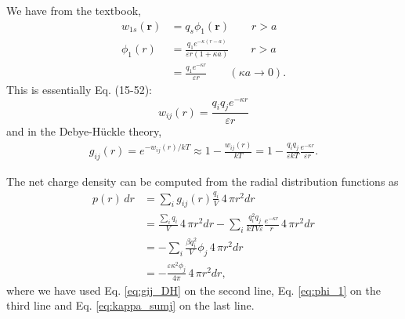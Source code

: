 \documentclass[twocolumn, 10pt]{article}
\numberwithin{equation}{section}
\newenvironment{solution}[1][\empty]
{\par\medskip\sffamily
  \textbf{\ifx\empty#1{Solution.}\relax\else{#1}\fi} \ignorespaces}
{\medskip}
\begin{document}
\begin{solution}
  We have from the textbook,
  \begin{align}
    w_{1s}(\mathbf r)
    &=
    q_s \phi_1(\mathbf r)
    \qquad r > a
    \tag{15-26}
    \\
    \phi_1(r)
    &=
    \frac{ q_1 e^{-\kappa(r-a) } }
    { \varepsilon r (1 + \kappa a) }
    \qquad r > a
    \tag{15-40}
    \\
    &=
    \frac{ q_1 e^{-\kappa r} }
    { \varepsilon r }
    \qquad (\kappa a \to 0)
    .
    \label{eq:phi_1}
  \end{align}
  This is essentially Eq. (15-52):
  \begin{equation}
    w_{ij}(r) =
    \frac{ q_i q_j e^{-\kappa r } } { \varepsilon r }
    \tag{15-52}
  \end{equation}
  and in the Debye-H\"uckle theory,
  \begin{align*}
    g_{ij}(r)
    =
    e^{-w_{ij}(r)/kT}
    \approx
    1-\frac{w_{ij}(r)}{kT}
    =
    1-
    \frac{ q_i q_j } {\varepsilon kT }
    \frac{ e^{-\kappa r } } { \varepsilon r }
    .
  \end{align*}

  The net charge density can be computed from
  the radial distribution functions as
  \begin{align*}
    p(r) \, dr
    &=
    \sum_i g_{ij}(r) \frac{ q_i } { V } \, 4 \, \pi r^2 dr
    \\
    &=
    \frac{ \sum_i q_i } { V } \, 4 \, \pi r^2 dr
    -
    \sum_i \frac{ q_i^2 q_j } { kT V \varepsilon }
    \frac{ e^{-\kappa r } } { r}
    \, 4 \, \pi r^2 dr
    \\
    &=
    -
    \sum_i \frac{ \beta q_i^2 } { V }
    \phi_j
    \, 4 \, \pi r^2 dr
    \\
    &=
    -
    \frac{ \varepsilon \kappa^2 \phi_j } { 4 \pi }
    \, 4 \, \pi r^2 dr
    ,
  \end{align*}
  where we have used
  Eq. \eqref{eq:gij_DH} on the second line,
  Eq. \eqref{eq:phi_1} on the third line
  and
  Eq. \eqref{eq:kappa_sumj} on the last line.
\end{solution}
\end{document}
